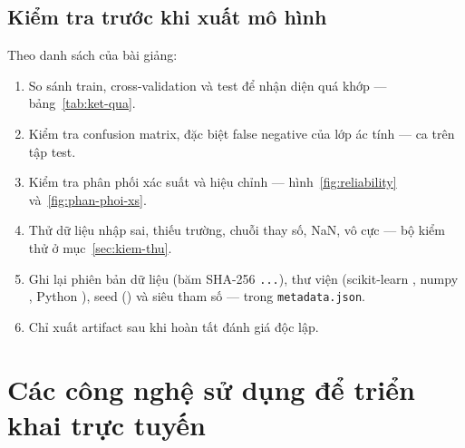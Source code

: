 \documentclass[12pt]{article}
\begin{document}
\subsection{Kiểm tra trước khi xuất mô hình}
Theo danh sách của bài giảng:
\begin{enumerate}
  \item So sánh train, cross-validation và test để nhận diện quá khớp --- bảng~\ref{tab:ket-qua}.
  \item Kiểm tra confusion matrix, đặc biệt false negative của lớp ác tính --- \TestFN{} ca trên tập test.
  \item Kiểm tra phân phối xác suất và hiệu chỉnh --- hình~\ref{fig:reliability} và~\ref{fig:phan-phoi-xs}.
  \item Thử dữ liệu nhập sai, thiếu trường, chuỗi thay số, NaN, vô cực --- bộ kiểm thử ở mục~\ref{sec:kiem-thu}.
  \item Ghi lại phiên bản dữ liệu (băm SHA-256 \texttt{\DataHashShort...}), thư viện (scikit-learn \SklearnVersion,
        numpy \NumpyVersion, Python \PythonVersion), seed (\RandomState) và siêu tham số --- trong \texttt{metadata.json}.
  \item Chỉ xuất artifact sau khi hoàn tất đánh giá độc lập.
\end{enumerate}

\section{Các công nghệ sử dụng để triển khai trực tuyến}
\end{document}
